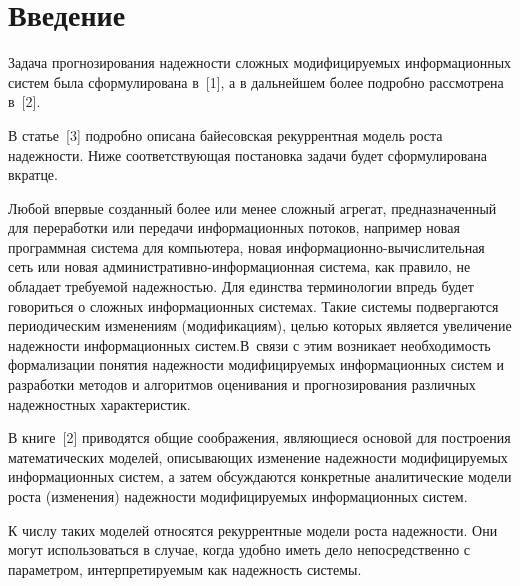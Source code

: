 


      \thispagestyle{headings}

      \begin{multicols}{2}

            \label{st\stat}


\section{Введение}

Задача прогнозирования надежности сложных модифицируемых
информационных систем была сформулирована в~[1], а в дальнейшем
более подробно рассмотрена в~[2].

В статье~[3] подробно описана байесовская рекуррентная модель роста надежности.
Ниже соответствующая постановка задачи будет сформулирована вкратце.

Любой впервые созданный более или менее сложный агрегат,
предназначенный для переработки или передачи информационных потоков,
например новая программная система для компьютера, новая
ин\-фор\-ма\-ци\-он\-но-вы\-чис\-ли\-тель\-ная сеть или новая
адми\-ни\-ст\-ра\-тив\-но-ин\-фор\-ма\-ци\-он\-ная сис\-те\-ма, как правило, не обладает
требуемой надежностью. Для единства терминологии впредь будет
говориться о сложных информационных сис\-те\-мах. Такие сис\-те\-мы
подвергаются периодическим изменениям (модификациям), целью которых
является увеличение надежности информационных сис\-тем.\linebreak В~связи с этим
возникает необходимость формализации понятия надежности
модифицируемых информационных сис\-тем и разработки методов и
алгорит\-мов оценивания и прогнозирования различных надежностных
характеристик.

В книге~[2]  приводятся общие соображения, являющиеся основой для
построения математических моделей, описывающих изменение надеж\-ности
модифицируемых информационных сис\-тем, а затем обсуждаются конкретные
аналитические модели роста (изменения) надежности мо\-ди\-фи\-ци\-ру\-емых
информационных сис\-тем.

К числу таких  моделей относятся рекуррентные модели роста
надежности. Они могут использоваться в случае, когда удобно иметь
дело непосредственно с параметром, интерпретируемым как надежность
системы.


\end{multicols}
